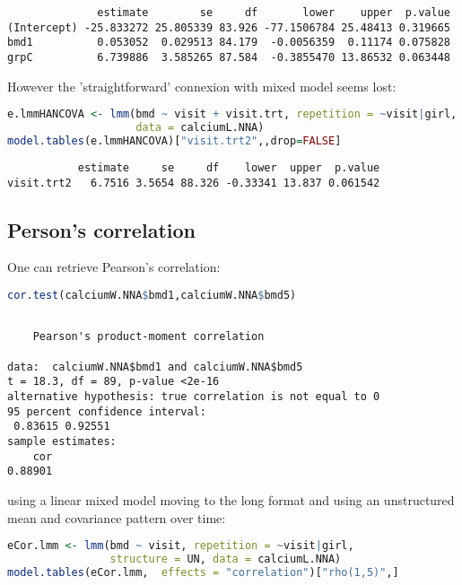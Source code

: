 \documentclass[12pt]{article}
\begin{document}
\label{}
\begin{verbatim}
              estimate        se     df       lower    upper  p.value
(Intercept) -25.833272 25.805339 83.926 -77.1506784 25.48413 0.319665
bmd1          0.053052  0.029513 84.179  -0.0056359  0.11174 0.075828
grpC          6.739886  3.585265 87.584  -0.3855470 13.86532 0.063448
\end{verbatim}


However the 'straightforward' connexion with mixed model seems lost:
\begin{lstlisting}[language=r,numbers=none]
e.lmmHANCOVA <- lmm(bmd ~ visit + visit.trt, repetition = ~visit|girl, structure = UN(~grp),
                    data = calciumL.NNA)
model.tables(e.lmmHANCOVA)["visit.trt2",,drop=FALSE]

\end{lstlisting}

\label{}
\begin{verbatim}
           estimate     se     df    lower  upper  p.value
visit.trt2   6.7516 3.5654 88.326 -0.33341 13.837 0.061542
\end{verbatim}


\clearpage
\subsection{Person's correlation}
\label{sec:orgfe23b02}

One can retrieve Pearson's correlation:
\begin{lstlisting}[language=r,numbers=none]
cor.test(calciumW.NNA$bmd1,calciumW.NNA$bmd5)
\end{lstlisting}

\label{}
\begin{verbatim}

	Pearson's product-moment correlation

data:  calciumW.NNA$bmd1 and calciumW.NNA$bmd5
t = 18.3, df = 89, p-value <2e-16
alternative hypothesis: true correlation is not equal to 0
95 percent confidence interval:
 0.83615 0.92551
sample estimates:
    cor 
0.88901
\end{verbatim}

using a linear mixed model moving to the long format and using an
unstructured mean and covariance pattern over time:
\begin{lstlisting}[language=r,numbers=none]
eCor.lmm <- lmm(bmd ~ visit, repetition = ~visit|girl,
                structure = UN, data = calciumL.NNA)
model.tables(eCor.lmm,  effects = "correlation")["rho(1,5)",]
\end{lstlisting}
\end{document}
